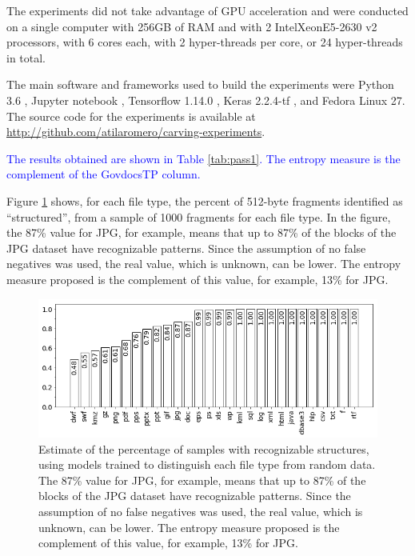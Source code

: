 The experiments did not take advantage of GPU acceleration and were  conducted on a single computer with 256GB of RAM and with 2 Intel\textregistered Xeon\textregistered E5-2630 v2 processors, with 6 cores each, with 2 hyper-threads per core, or 24 hyper-threads in total. 


The main software and frameworks used to build the experiments were Python 3.6 {\color{red}
\cite{rossum_python_2019}, Jupyter notebook \cite{perez_jupyter_2019}, Tensorflow 1.14.0 \cite{google_brain_tensorflow_2019}, Keras 2.2.4-tf \cite{chollet_keras_2019}}, and Fedora Linux 27.
The source code for the experiments is available at \sloppy\url{http://github.com/atilaromero/carving-experiments}.




\textcolor{blue}{The results obtained are shown in Table \ref{tab:pass1}. The entropy measure is the complement of the GovdocsTP column.}

Figure \ref{fig:not_random} shows, for each file type, the percent of 512-byte fragments identified as ``structured'', from a sample of 1000 fragments for each file type.
In the figure, the 87\% value for JPG, for example, means that up to 87\% of the blocks of the JPG dataset have recognizable patterns. Since the assumption of no false negatives was used, the real value, which is unknown, can be lower. The entropy measure proposed is the complement of this value, for example, 13\% for JPG.

\noindent
\begin{figure}[htb!]
\centering\includegraphics[width=1.0\textwidth]{content/random.png}
\caption[Complement of entropy measure for 28 file types]{\label{fig:not_random}Estimate of the percentage of samples with recognizable structures, using models trained to distinguish each file type from random data. The 87\% value for JPG, for example, means that up to 87\% of the blocks of the JPG dataset have recognizable patterns. Since the assumption of no false negatives was used, the real value, which is unknown, can be lower. The entropy measure proposed is the complement of this value, for example, 13\% for JPG.}%
\end{figure}
